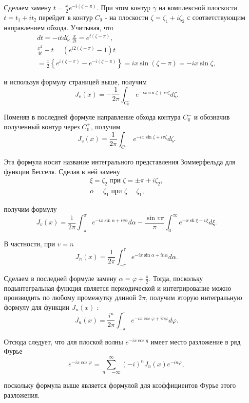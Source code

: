 Сделаем замену $t=\frac{x}{2} e^{-i(\zeta-\pi)}$. При этом контур $\gamma$ на комплексной плоскости $t=t_{1}+i t_{2}$ перейдет в контур $C_{0}$ - на плоскости $\zeta=\zeta_{1}+i \zeta_{2}$ с соответствующим направлением обхода. Учитывая, что
\[
\begin{aligned}
	d t=-i t d \zeta, \frac{x}{2 t}=e^{i(\zeta-\pi)}, \\
	\frac{x^{2}}{4 t}-t=\left(e^{i 2(\zeta-\pi)}-1\right) t= \\
	=\frac{x}{2}\left\{e^{i(\zeta-\pi)}-e^{-i(\zeta-\pi)}\right\}=i x \sin (\zeta-\pi)=-i x \sin \zeta,
\end{aligned}
\]

и используя формулу страницей выше, получим
\[
J_{v}(x)=-\frac{1}{2 \pi} \int_{C_{0}^{-}} e^{-i x \sin \zeta+i v\zeta} d \zeta.
\]

Поменяв в последней формуле направление обхода контура $C_{0}^{-}$ и обозначив полученный контур через $C_{0}^{+}$, получим
\[
J_{v}(x)=\frac{1}{2 \pi} \int_{C_{0}^{+}} e^{-i x \sin \zeta +i v\zeta} d \zeta .
\]

Эта формула носит название интегрального представления Зоммерфельда для функции Бесселя. Сделав в ней замену
\[
\begin{array}{l}
	\xi=\zeta_{2} \text { при } \zeta= \pm \pi+i\zeta_2, \\
	\alpha=\zeta_{1} \text { при } \zeta=\zeta_{1},
\end{array}
\]

получим формулу
\[
J_{v}(x)=\frac{1}{2 \pi} \int_{-\pi}^{\pi} e^{-i x \sin \alpha+i v \alpha} d \alpha-\frac{\sin v \pi}{\pi} \int_{0}^{\infty} e^{-x \operatorname{sh} \xi-v \xi} d \xi .
\]

В частности, при $v=n$
\[
J_{n}(x)=\frac{1}{2 \pi} \int_{-\pi}^{\tau} e^{-i x \sin \alpha+i n \alpha} d \alpha .
\]


Сделаем в последней формуле замену $\alpha=\varphi+\frac{\pi}{2}$. Тогда, поскольку подынтегральная функция является периодической и интегрирование можно производить по любому промежутку длнной $2 \pi$, получим вторую интегральную формулу для функции $J_{n}(x)$ :
\[
J_{n}(x)=\frac{i^{n}}{2 \pi} \int_{-\pi}^{\pi} e^{-i x \cos \varphi+i n \varphi} d \varphi .
\]

Отсюда следует, что для плоской волны $e^{-i x \cos q}$ имеет место разложение в ряд Фурье
\[
e^{-i x \cos \varphi}=\sum_{n=-\infty}^{\infty}(-i)^{n} J_{n}(x) e^{-i n \varphi},
\]

поскольку формула выше является формулой для коэффициентов Фурье этого разложения.

